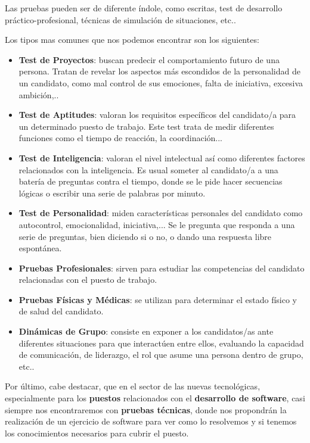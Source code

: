 Las pruebas pueden ser de diferente índole, como escritas, test de desarrollo práctico-profesional, técnicas de simulación de situaciones, etc..

Los tipos mas comunes que nos podemos encontrar son los siguientes:

\begin{itemize}
    \item \textbf{Test de Proyectos}: buscan predecir el comportamiento futuro de una persona. Tratan de revelar los aspectos más escondidos de la personalidad de un candidato, como mal control de sus emociones, falta de iniciativa, excesiva ambición,..
    \item \textbf{Test de Aptitudes}: valoran los requisitos específicos del candidato/a para un determinado puesto de trabajo. Este test trata de medir diferentes funciones como el tiempo de reacción, la coordinación...
    \item \textbf{Test de Inteligencia}: valoran el nivel intelectual así como diferentes factores relacionados con la inteligencia. Es usual someter al candidato/a a una batería de preguntas contra el tiempo, donde se le pide hacer secuencias lógicas o escribir una serie de palabras por minuto.
    \item \textbf{Test de Personalidad}: miden características personales del candidato como autocontrol, emocionalidad, iniciativa,... Se le pregunta que responda a una serie de preguntas, bien diciendo si o no, o dando una respuesta libre espontánea.
    \item \textbf{Pruebas Profesionales}: sirven para estudiar las competencias del candidato relacionadas con el puesto de trabajo.
    \item \textbf{Pruebas Físicas y Médicas}: se utilizan para determinar el estado físico y de salud del candidato.
    \item \textbf{Dinámicas de Grupo}: consiste en exponer a los candidatos/as ante diferentes situaciones para que interactúen entre ellos, evaluando la capacidad de comunicación, de liderazgo, el rol que asume una persona dentro de grupo, etc..
\end{itemize}

Por último, cabe destacar, que en el sector de las nuevas tecnológicas, especialmente para los \textbf{puestos} relacionados con el \textbf{desarrollo de software}, casi siempre nos encontraremos con \textbf{pruebas técnicas}, donde nos propondrán la realización de un ejercicio de software para ver como lo resolvemos y si tenemos los conocimientos necesarios para cubrir el puesto.

